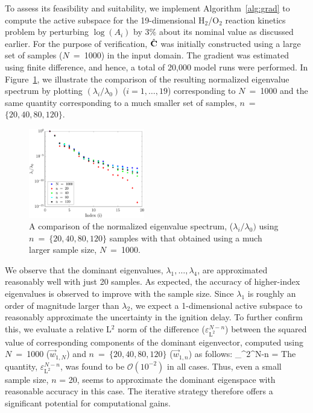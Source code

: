 To assess its feasibility and suitability, we implement
Algorithm~\ref{alg:grad} to compute the active subspace for 
the 19-dimensional H$_2$/O$_2$ reaction kinetics
problem by perturbing $\log(A_i)$ by 3$\%$ about its nominal
value as discussed earlier. For the purpose of verification,
$\hat{\mathbf{{C}}}$ was initially constructed using a large set of samples
($N$~=~1000) in the input domain. The gradient was estimated using
finite difference, and hence, a total of 20,000 model runs were performed. 
In Figure~\ref{fig:eig_comp}, we illustrate the comparison of
the resulting normalized eigenvalue spectrum by plotting 
$(\lambda_i/\lambda_0)$
($i = 1,\ldots,19$) corresponding to $N$~=~1000 and the same quantity corresponding to
a much smaller set of samples, $n$~=~$\{20,40,80,120\}$.
%
\begin{figure}[htbp]
 \begin{center}
  \includegraphics[width=0.45\textwidth]{./Figures/eig_comp_p3}
\caption{A comparison of the normalized eigenvalue spectrum, 
($\lambda_i/\lambda_0)$
using $n$~=~$\{20,40,80,120\}$ samples with that
obtained using a much larger sample size, $N$~=~1000. 
} 
\label{fig:eig_comp}
\end{center}
\end{figure}
%
We observe that the dominant eigenvalues, $\lambda_1, \ldots, \lambda_4$, 
are approximated 
reasonably well with just 20 samples. As expected, the accuracy of higher-index
 eigenvalues is observed
to improve with the sample size. Since 
$\lambda_1$ is roughly an order of magnitude larger than $\lambda_2$, we expect 
a 1-dimensional active subspace to reasonably approximate the uncertainty
in the ignition delay. 
To further confirm this, we evaluate a relative L$^2$ norm of the difference
 ($\varepsilon_{\text{L}^{2}}^{N-n}$) between the 
squared value of corresponding components of the dominant eigenvector, computed using $N$~=~1000 ($\vec{w}_{1,N}$)
and $n$~=~$\{20,40,80,120\}$ ($\vec{w}_{1,n}$) as follows:
%
\be
\varepsilon_{^{2}}^{N-n} = 
\label{eq:accu}
\ee
%
The quantity, $\varepsilon_{\text{L}^{2}}^{N-n}$, was found to be 
$\mathcal{O}(10^{-2})$ in all cases.
Thus, even a small sample size, $n$ = 20, seems to approximate the dominant eigenspace with
reasonable accuracy in this case. 
The iterative strategy therefore offers a significant potential for computational gains. 

